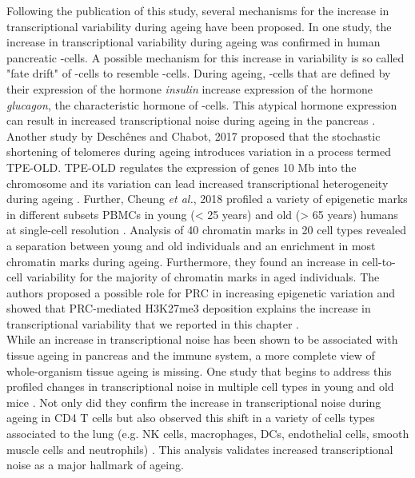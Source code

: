Following the publication of this study, several mechanisms for the increase in transcriptional variability during ageing have been proposed. In one study, the increase in transcriptional variability during ageing was confirmed in human pancreatic \textbeta{}-cells. A possible mechanism for this increase in variability is so called "fate drift" of \textbeta{}-cells to resemble \textalpha{}-cells. During ageing, \textbeta{}-cells that are defined by their expression of the hormone \emph{insulin} increase expression of the hormone \emph{glucagon}, the characteristic hormone of \textalpha{}-cells. This atypical hormone expression can result in increased transcriptional noise during ageing in the pancreas \citep{Enge2017}. Another study by Desch\^{e}nes and Chabot, 2017 proposed that the stochastic shortening of telomeres during ageing introduces variation in a process termed \gls{TPE-OLD}. TPE-OLD regulates the expression of genes 10 Mb into the chromosome and its variation can lead increased transcriptional heterogeneity during ageing \cite{Deschenes2017}. Further, Cheung \emph{et al.}, 2018 profiled a variety of epigenetic marks in different subsets \glspl{PBMC} in young (< 25 years) and old (> 65 years) humans at single-cell resolution \citep{Cheung2018}. Analysis of 40 chromatin marks in 20 cell types revealed a separation between young and old individuals and an enrichment in most chromatin marks during ageing. Furthermore, they found an increase in cell-to-cell variability for the majority of chromatin marks in aged individuals. The authors proposed a possible role for \gls{PRC} in increasing epigenetic variation and showed that PRC-mediated H3K27me3 deposition explains the increase in transcriptional variability that we reported in this chapter \citep{Cheung2018}.\\

While an increase in transcriptional noise has been shown to be associated with tissue ageing in pancreas and the immune system, a more complete view of whole-organism tissue ageing is missing. One study that begins to address this profiled changes in transcriptional noise in multiple cell types in young and old mice \citep{Angelidis2018}. Not only did they confirm the increase in transcriptional noise during ageing in CD4\plus{} T cells but also observed this shift in a variety of cells types associated to the lung (e.g. NK cells, macrophages, DCs, endothelial cells, smooth muscle cells and neutrophils) \citep{Angelidis2018}. This analysis validates increased transcriptional noise as a major hallmark of ageing. \\

